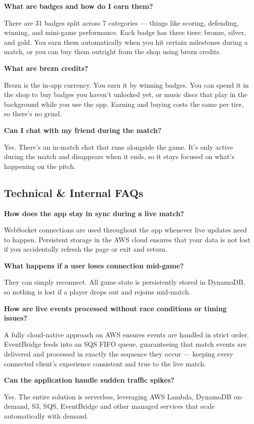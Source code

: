 \documentclass[12pt]{article}
\begin{document}
\textbf{What are badges and how do I earn them?}

There are 31 badges split across 7 categories — things like scoring, defending, winning, and mini-game performance. Each badge has three tiers: bronze, silver, and gold. You earn them automatically when you hit certain milestones during a match, or you can buy them outright from the shop using brezn credits.

\textbf{What are brezn credits?}

Brezn is the in-app currency. You earn it by winning badges. You can spend it in the shop to buy badges you haven't unlocked yet, or music discs that play in the background while you use the app. Earning and buying costs the same per tier, so there's no grind.

\textbf{Can I chat with my friend during the match?}

Yes. There's an in-match chat that runs alongside the game. It's only active during the match and disappears when it ends, so it stays focused on what's happening on the pitch.

\subsection*{Technical \& Internal FAQs}

\textbf{How does the app stay in sync during a live match?}

WebSocket connections are used throughout the app whenever live updates need 
to happen. Persistent storage in the AWS cloud ensures that your data is not 
lost if you accidentally refresh the page or exit and return.

\textbf{What happens if a user loses connection mid-game?}

They can simply reconnect. All game state is persistently stored in DynamoDB, 
so nothing is lost if a player drops out and rejoins mid-match.

\textbf{How are live events processed without race conditions or timing issues?}

A fully cloud-native approach on AWS ensures events are handled in strict order. 
EventBridge feeds into an SQS FIFO queue, guaranteeing that match events are 
delivered and processed in exactly the sequence they occur — keeping every 
connected client's experience consistent and true to the live match.

\textbf{Can the application handle sudden traffic spikes?}

Yes. The entire solution is serverless, leveraging AWS Lambda, DynamoDB 
on-demand, S3, SQS, EventBridge and other managed services that scale automatically with demand.
\end{document}
